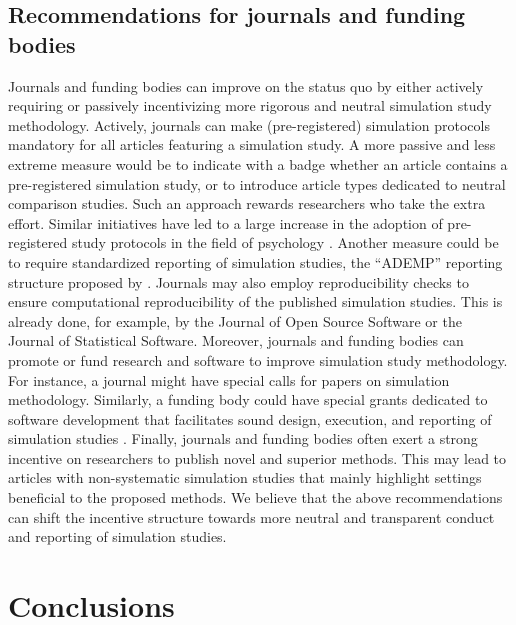 \documentclass[a4paper, 11pt]{article}
\begin{document}
\subsection{Recommendations for journals and funding bodies}
Journals and funding bodies can improve on the status quo by either actively
requiring or passively incentivizing more rigorous and neutral simulation study
methodology. Actively, journals can make (pre-registered) simulation protocols
mandatory for all articles featuring a simulation study. A more passive and less 
extreme measure would be to indicate with a badge whether an article contains
a pre-registered simulation study, or to introduce article types dedicated to
neutral comparison studies. Such an approach rewards researchers who take the
extra effort. Similar initiatives have led to a large increase in the adoption
of pre-registered study protocols in the field of psychology \citep{Kidwell2016}.
Another measure could be to require standardized reporting 
of simulation studies, \eg{} the ``ADEMP'' reporting structure proposed by 
\citet{Morris2019}. Journals may also employ reproducibility checks to ensure 
computational reproducibility of the published simulation studies. This is 
already done, for example, by the Journal of Open Source Software or the Journal 
of Statistical Software. Moreover, journals and funding bodies can promote or fund
research and software to improve simulation study methodology. For instance, a
journal might have special calls for papers on simulation methodology. Similarly,
a funding body could have special grants dedicated to software development
that facilitates sound design, execution, and reporting of simulation studies
\citep[as, for example,][]{White2010, Gasparini2018, Chalmers2020}.
Finally, journals and funding bodies often exert a strong incentive on researchers
to publish novel and superior methods. This may lead to articles with
non-systematic simulation studies that mainly highlight settings beneficial
to the proposed methods. We believe that the above recommendations 
can shift the incentive structure towards more neutral and transparent 
conduct and reporting of simulation studies.

\section{Conclusions} \label{sec:discussion}
\end{document}
